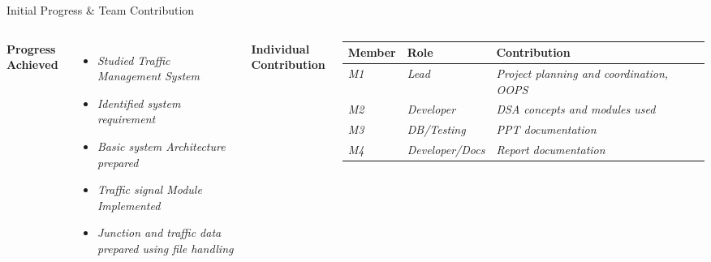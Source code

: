 \documentclass[aspectratio=169,11pt]{beamer}
\newcommand{\placeholder}[1]{\textit{\color{GEUGrey}#1}}
\begin{document}
\begin{frame}{Initial Progress \& Team Contribution}
\begin{columns}[T,totalwidth=\textwidth]
\textbf{\color{GEUBlue}Progress Achieved}
\begin{itemize}\itemsep2pt
\item \placeholder{Studied Traffic Management System}
\item \placeholder{Identified system requirement}
\item \placeholder{Basic system Architecture prepared}
\item \placeholder{Traffic signal Module Implemented}
\item \placeholder{Junction and traffic data prepared using file handling}
\end{itemize}
\textbf{\color{GEUBlue}Individual Contribution}
\vspace{2mm}
\scriptsize
\begin{tabularx}{\textwidth}{@{}p{1.8cm}p{2.0cm}X@{}}
\toprule
Member & Role & Contribution\\
\midrule
\placeholder{M1} & \placeholder{Lead} & \placeholder{Project planning and coordination, OOPS}\\
\placeholder{M2} & \placeholder{Developer} & \placeholder{DSA concepts and modules used}\\
\placeholder{M3} & \placeholder{DB/Testing} & \placeholder{PPT documentation}\\
\placeholder{M4} & \placeholder{Developer/Docs} & \placeholder{Report documentation}\\
\bottomrule
\end{tabularx}
\end{columns}
\end{frame}
\end{document}
